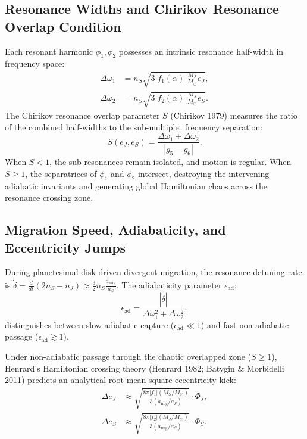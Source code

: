 \documentclass[11pt,a4paper]{article}
\begin{document}
\subsection{Resonance Widths and Chirikov Resonance Overlap Condition}
Each resonant harmonic $\phi_1, \phi_2$ possesses an intrinsic resonance half-width in frequency space:
\begin{align}
\Delta \omega_1 &= n_S \sqrt{3 |f_1(\alpha)| \frac{M_J}{M_\odot} e_J}, \\
\Delta \omega_2 &= n_S \sqrt{3 |f_2(\alpha)| \frac{M_S}{M_\odot} e_S}.
\end{align}
The Chirikov resonance overlap parameter $S$ (Chirikov 1979) measures the ratio of the combined half-widths to the sub-multiplet frequency separation:
\begin{equation}
S(e_J, e_S) = \frac{\Delta \omega_1 + \Delta \omega_2}{|g_5 - g_6|}.
\end{equation}
When $S < 1$, the sub-resonances remain isolated, and motion is regular. When $S \ge 1$, the separatrices of $\phi_1$ and $\phi_2$ intersect, destroying the intervening adiabatic invariants and generating global Hamiltonian chaos across the resonance crossing zone.

\subsection{Migration Speed, Adiabaticity, and Eccentricity Jumps}
During planetesimal disk-driven divergent migration, the resonance detuning rate is $\dot{\delta} = \frac{d}{dt}(2n_S - n_J) \approx \frac{3}{2} n_S \frac{\dot{a}_{\text{mig}}}{a_S}$. The adiabaticity parameter $\epsilon_{\mathrm{ad}}$:
\begin{equation}
\epsilon_{\mathrm{ad}} = \frac{|\dot{\delta}|}{\Delta \omega_1^2 + \Delta \omega_2^2},
\end{equation}
distinguishes between slow adiabatic capture ($\epsilon_{\mathrm{ad}} \ll 1$) and fast non-adiabatic passage ($\epsilon_{\mathrm{ad}} \gtrsim 1$).

Under non-adiabatic passage through the chaotic overlapped zone ($S \ge 1$), Henrard's Hamiltonian crossing theory (Henrard 1982; Batygin \& Morbidelli 2011) predicts an analytical root-mean-square eccentricity kick:
\begin{align}
\Delta e_J &\approx \sqrt{\frac{8\pi |f_1| (M_S / M_\odot)}{3 (\dot{a}_{\text{mig}} / a_S)}} \cdot \Phi_J, \\
\Delta e_S &\approx \sqrt{\frac{8\pi |f_2| (M_J / M_\odot)}{3 (\dot{a}_{\text{mig}} / a_S)}} \cdot \Phi_S.
\end{align}
\end{document}
